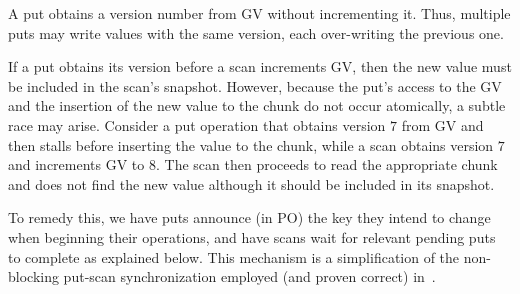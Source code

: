 

A put obtains a version number from GV without incrementing it. Thus, multiple puts may write values with the same version, each over-writing the previous one. 

If a put obtains its version before a scan increments GV, then the new value must be included in the scan's snapshot. 
However, because the put's access to the GV and the insertion of the new value to the chunk do not occur atomically,
a subtle race may arise. Consider a put operation that obtains version $7$ from GV and then stalls before
inserting the value to the chunk, while a scan obtains version $7$ and increments GV to $8$. The scan then proceeds 
to read the appropriate chunk and does not find the new value although it should be included in its snapshot.

To remedy this, we have puts announce (in PO) the key they intend to change when beginning their operations, and have scans wait for relevant pending puts to complete as explained below.
This mechanism is a simplification of the non-blocking put-scan synchronization employed (and proven correct) in~\cite{kiwi}.




